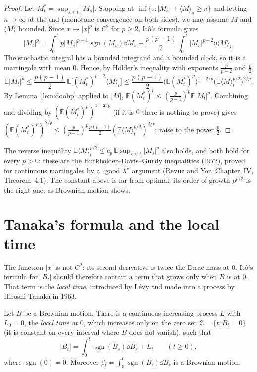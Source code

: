 \begin{proof}
Let $M^*_t=\sup_{s\le t}|M_s|$. Stopping at $\inf\{s:|M_s|+\langle M\rangle_s\ge n\}$ and letting $n\to\infty$ at the end (monotone convergence on both sides), we may assume $M$ and $\langle M\rangle$ bounded. Since $x\mapsto|x|^p$
is $C^2$ for $p\ge2$, It\^o's formula gives
\[
|M_t|^p=\int_0^tp|M_s|^{p-1}\operatorname{sgn}(M_s)\dd M_s+\frac{p(p-1)}2\int_0^t|M_s|^{p-2}\dd\langle M\rangle_s .
\]
The stochastic integral has a bounded integrand and a bounded clock, so it is a martingale with mean $0$. Hence, by H\"older's inequality with exponents $\frac p{p-2}$ and $\frac p2$,
\[
\mathbb E|M_t|^p\le\frac{p(p-1)}2\,\mathbb E\bigl[(M^*_t)^{p-2}\langle M\rangle_t\bigr]\le\frac{p(p-1)}2\bigl(\mathbb E(M^*_t)^p\bigr)^{1-2/p}\bigl(\mathbb E\langle M\rangle_t^{p/2}\bigr)^{2/p}.
\]
By Lemma~\ref{lem:doobp} applied to $|M|$, $\mathbb E(M^*_t)^p\le(\frac p{p-1})^p\mathbb E|M_t|^p$. Combining and dividing by $(\mathbb E(M^*_t)^p)^{1-2/p}$ (if it is $0$ there is nothing to prove) gives
$(\mathbb E(M^*_t)^p)^{2/p}\le(\frac p{p-1})^p\frac{p(p-1)}2(\mathbb E\langle M\rangle_t^{p/2})^{2/p}$; raise to the power $\frac p2$.
\end{proof}

\begin{remark}
The reverse inequality $\mathbb E\langle M\rangle_t^{p/2}\le c_p\,\mathbb E\sup_{s\le t}|M_s|^p$ also holds, and both hold for every $p>0$: these are the Burkholder--Davis--Gundy inequalities (1972), proved for
continuous martingales by a ``good $\lambda$'' argument (Revuz and Yor, Chapter~IV, Theorem~4.1). The constant above is far from optimal; its order of growth $p^{p/2}$ is the right one, as Brownian motion shows.
\end{remark}

\section{Tanaka's formula and the local time}

The function $|x|$ is not $C^2$: its second derivative is twice the Dirac mass at $0$. It\^o's formula for $|B_t|$ should therefore contain a term that grows only when $B$ is at $0$. That term is the
\emph{local time}, introduced by L\'evy and made into a process by Hiroshi Tanaka in 1963.

\begin{theorem}\label{thm:tanaka}
Let $B$ be a Brownian motion. There is a continuous increasing process $L$ with $L_0=0$, the \emph{local time at $0$}, which increases only on the zero set $\mathcal Z=\{t:B_t=0\}$ (it is constant on every interval where
$B$ does not vanish), such that
\[
|B_t|=\int_0^t\operatorname{sgn}(B_s)\dd B_s+L_t\qquad(t\ge0),
\]
where $\operatorname{sgn}(0)=0$. Moreover $\beta_t=\int_0^t\operatorname{sgn}(B_s)\dd B_s$ is a Brownian motion.
\end{theorem}

